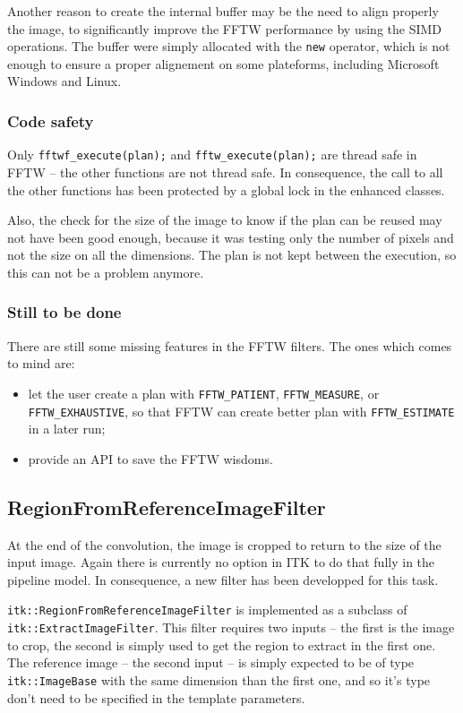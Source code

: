 \documentclass{InsightArticle}
\begin{document}
Another reason to create the internal buffer may be the need to align properly the image, to significantly
improve the FFTW performance by using the SIMD operations. The buffer were simply allocated with the
\verb$new$ operator, which is not enough to ensure a proper alignement
on some plateforms, including Microsoft Windows and Linux.


\subsubsection{Code safety}

Only \verb$fftwf_execute(plan);$ and \verb$fftw_execute(plan);$ are thread safe in FFTW -- the other functions
are not thread safe. In consequence, the call to all the other functions has been protected by a 
global lock in the enhanced classes.

Also, the check for the size of the image to know if the plan can be reused may not have been good 
enough, because it was testing only the number of pixels and not the size on all the dimensions. 
The plan is not kept between the execution, so this can not be a problem anymore.

\subsubsection{Still to be done}

There are still some missing features in the FFTW filters. The ones which comes to mind are:
\begin{itemize}
 \item let the user create a plan with \verb$FFTW_PATIENT$, \verb$FFTW_MEASURE$, or
\verb$FFTW_EXHAUSTIVE$, so that FFTW can create better plan with \verb$FFTW_ESTIMATE$ in a
later run;
 \item provide an API to save the FFTW wisdoms.
\end{itemize}


\subsection{RegionFromReferenceImageFilter}

At the end of the convolution, the image is cropped to return to the size of the input image. Again
there is currently no option in ITK to do that fully in the pipeline model. In consequence, a new
filter has been developped for this task.

\verb$itk::RegionFromReferenceImageFilter$ is implemented as a subclass of \verb$itk::ExtractImageFilter$.
This filter requires two inputs -- the first is the image to crop, the second is simply used to get 
the region to extract in the first one. The reference image -- the second input -- is simply expected to
be of type \verb$itk::ImageBase$ with the same dimension than the first one, and so it's type don't
need to be specified in the template parameters.
\end{document}
